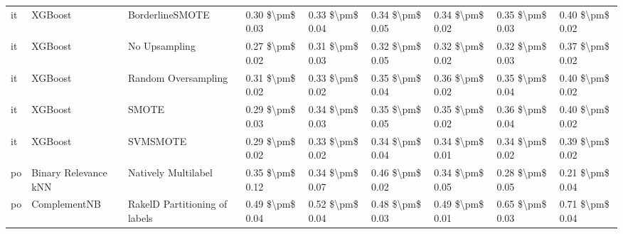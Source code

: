 \begin{tabular}{lllllllll}
      it &                         XGBoost &               BorderlineSMOTE &     0.30 \$\textbackslash pm\$ 0.03 &           0.33 \$\textbackslash pm\$ 0.04 &       0.34 \$\textbackslash pm\$ 0.05 &        0.34 \$\textbackslash pm\$ 0.02 &                         0.35 \$\textbackslash pm\$ 0.03 &     0.40 \$\textbackslash pm\$ 0.02 \\
      it &                         XGBoost &                 No Upsampling &     0.27 \$\textbackslash pm\$ 0.02 &           0.31 \$\textbackslash pm\$ 0.03 &       0.32 \$\textbackslash pm\$ 0.05 &        0.32 \$\textbackslash pm\$ 0.02 &                         0.32 \$\textbackslash pm\$ 0.03 &     0.37 \$\textbackslash pm\$ 0.02 \\
      it &                         XGBoost &           Random Oversampling &     0.31 \$\textbackslash pm\$ 0.02 &           0.33 \$\textbackslash pm\$ 0.02 &       0.35 \$\textbackslash pm\$ 0.04 &        0.36 \$\textbackslash pm\$ 0.02 &                         0.35 \$\textbackslash pm\$ 0.04 &     0.40 \$\textbackslash pm\$ 0.02 \\
      it &                         XGBoost &                         SMOTE &     0.29 \$\textbackslash pm\$ 0.03 &           0.34 \$\textbackslash pm\$ 0.03 &       0.35 \$\textbackslash pm\$ 0.05 &        0.35 \$\textbackslash pm\$ 0.02 &                         0.36 \$\textbackslash pm\$ 0.04 &     0.40 \$\textbackslash pm\$ 0.02 \\
      it &                         XGBoost &                      SVMSMOTE &     0.29 \$\textbackslash pm\$ 0.02 &           0.33 \$\textbackslash pm\$ 0.02 &       0.34 \$\textbackslash pm\$ 0.04 &        0.34 \$\textbackslash pm\$ 0.01 &                         0.34 \$\textbackslash pm\$ 0.02 &     0.39 \$\textbackslash pm\$ 0.02 \\
      po &            Binary Relevance kNN &           Natively Multilabel &     0.35 \$\textbackslash pm\$ 0.12 &           0.34 \$\textbackslash pm\$ 0.07 &       0.46 \$\textbackslash pm\$ 0.02 &        0.34 \$\textbackslash pm\$ 0.05 &                         0.28 \$\textbackslash pm\$ 0.05 &     0.21 \$\textbackslash pm\$ 0.04 \\
      po &                    ComplementNB & RakelD Partitioning of labels &     0.49 \$\textbackslash pm\$ 0.04 &           0.52 \$\textbackslash pm\$ 0.04 &       0.48 \$\textbackslash pm\$ 0.03 &        0.49 \$\textbackslash pm\$ 0.01 &                         0.65 \$\textbackslash pm\$ 0.03 &     0.71 \$\textbackslash pm\$ 0.04 \\

\end{tabular}
